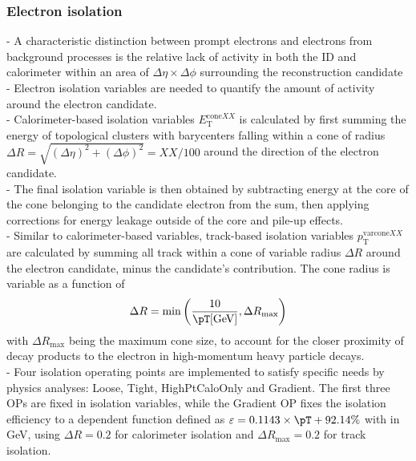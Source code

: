 \documentclass[../thesis.tex]{subfiles}
\begin{document}
\subsubsection*{Electron isolation}
\label{sec:eiso}
- A characteristic distinction between prompt electrons and electrons from background processes is the relative lack of activity in both the ID and calorimeter within an area of $\Delta \eta \times \Delta \phi$ surrounding the reconstruction candidate\\
- Electron isolation variables are needed to quantify the amount of activity around the electron candidate.\\
- Calorimeter-based isolation variables $E_\mathrm{T}^{\mathrm{cone}XX}$ is calculated by first summing the energy of topological clusters with barycenters falling within a cone of radius $\Delta R = \sqrt{(\Delta \eta)^2+(\Delta \phi)^2}=XX/100$ around the direction of the electron candidate.\\
- The final isolation variable is then obtained by subtracting energy at the core of the cone belonging to the candidate electron from the sum, then applying corrections for energy leakage outside of the core and pile-up effects.\\
- Similar to calorimeter-based variables, track-based isolation variables $p_\mathrm{T}^{\mathrm{varcone}XX}$ are calculated by summing all track \pT within a cone of variable radius $\Delta R$ around the electron candidate, minus the candidate's contribution. The cone radius is variable as a function of \pT
$$\Delta R = \min \left(\frac{10}{\pT \mathrm{ [GeV]}}, \Delta R_{\max} \right)$$
with $\Delta R_{\max}$ being the maximum cone size, to account for the closer proximity of decay products to the electron in high-momentum heavy particle decays.\\
- Four isolation operating points are implemented to satisfy specific needs by physics analyses: Loose, Tight, HighPtCaloOnly and Gradient. The first three OPs are fixed in isolation variables, while the Gradient OP fixes the isolation efficiency to a \pT dependent function defined as $ \varepsilon = 0.1143 \times \pT + 92.14\% $ with \pT in GeV, using $\Delta R=0.2$ for calorimeter isolation and $\Delta R_{\max}=0.2$ for track isolation\citep{reco:electron_meas}.

\end{document}
